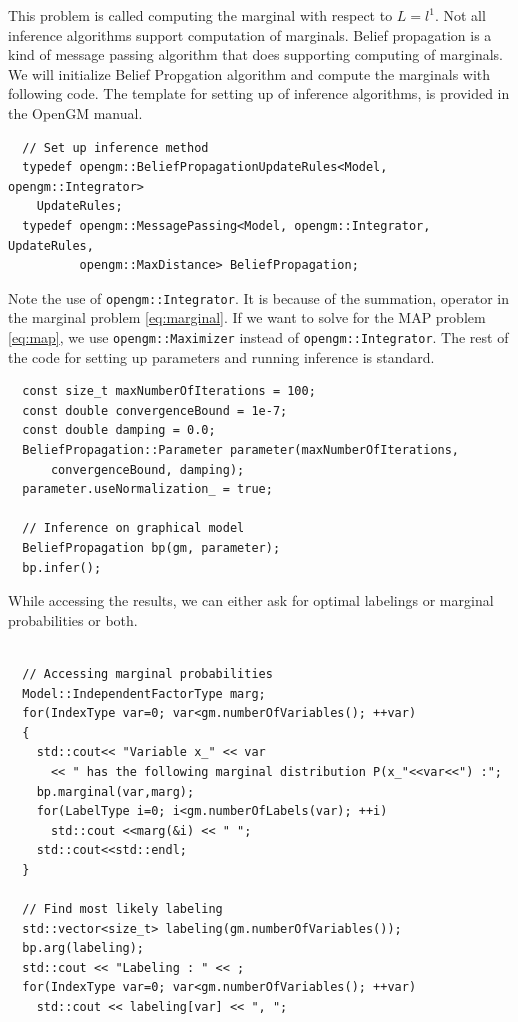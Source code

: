 \documentclass[12pt,oneside,letterpaper]{article}
\begin{document}
This problem is called computing the marginal with respect to $L = l^1$. Not
all inference algorithms support computation of marginals. Belief propagation
is a kind of message passing algorithm that does supporting computing of
marginals. We will initialize Belief Propgation algorithm and compute the
marginals with following code. The template for setting up of inference
algorithms, is provided in the OpenGM manual. 

\begin{lstlisting}
  // Set up inference method
  typedef opengm::BeliefPropagationUpdateRules<Model, opengm::Integrator>
    UpdateRules;
  typedef opengm::MessagePassing<Model, opengm::Integrator, UpdateRules,
          opengm::MaxDistance> BeliefPropagation;
\end{lstlisting}

Note the use of \lstinline|opengm::Integrator|. It is because of the summation,
operator in the marginal problem \eqref{eq:marginal}. If we want to
solve for the MAP problem \eqref{eq:map}, we use \lstinline|opengm::Maximizer| 
instead of \lstinline|opengm::Integrator|. The rest of the code for setting up parameters and running inference is standard.

\begin{lstlisting}
  const size_t maxNumberOfIterations = 100;
  const double convergenceBound = 1e-7;
  const double damping = 0.0;
  BeliefPropagation::Parameter parameter(maxNumberOfIterations,
      convergenceBound, damping);
  parameter.useNormalization_ = true;

  // Inference on graphical model
  BeliefPropagation bp(gm, parameter);
  bp.infer();

\end{lstlisting}

While accessing the results, we can either ask for optimal labelings or marginal probabilities or both.

\begin{lstlisting}

  // Accessing marginal probabilities
  Model::IndependentFactorType marg;
  for(IndexType var=0; var<gm.numberOfVariables(); ++var)
  {
    std::cout<< "Variable x_" << var 
      << " has the following marginal distribution P(x_"<<var<<") :";
    bp.marginal(var,marg);
    for(LabelType i=0; i<gm.numberOfLabels(var); ++i)
      std::cout <<marg(&i) << " ";
    std::cout<<std::endl;
  }   

  // Find most likely labeling
  std::vector<size_t> labeling(gm.numberOfVariables());
  bp.arg(labeling);
  std::cout << "Labeling : " << ;
  for(IndexType var=0; var<gm.numberOfVariables(); ++var)
    std::cout << labeling[var] << ", ";
\end{lstlisting}
\end{document}
